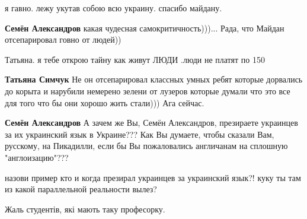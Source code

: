\begin{itemize}
я гавно. лежу укутав собою всю украину. спасибо майдану.

\begin{itemize}

\textbf{Семён Александров} какая чудесная самокритичность)))...
Рада, что Майдан отсепарировал говно от людей))


Татьяна. я тебе открою тайну как живут ЛЮДИ .люди не платят по 150%


\textbf{Татьяна Симчук} Не он отсепарировал классных умных ребят которые дорвались до корыта и нарубили немерено зелени от лузеров которые думали что это все для того что бы они хорошо жить стали))) Ага сейчас.


\textbf{Семён Александров} А зачем же Вы, Семён Александров, презираете украинцев за их украинский язык в Украине??? Как Вы думаете, чтобы сказали Вам, русскому, на Пикадилли, если бы Вы пожаловались англичанам на сплошную "англоизацию"???


назови пример кто и когда презирал украинцев за украинский язык?! куку ты там из какой параллельной реальности вылез?
\end{itemize}


Жаль студентів, які мають таку професорку.


\end{itemize}

